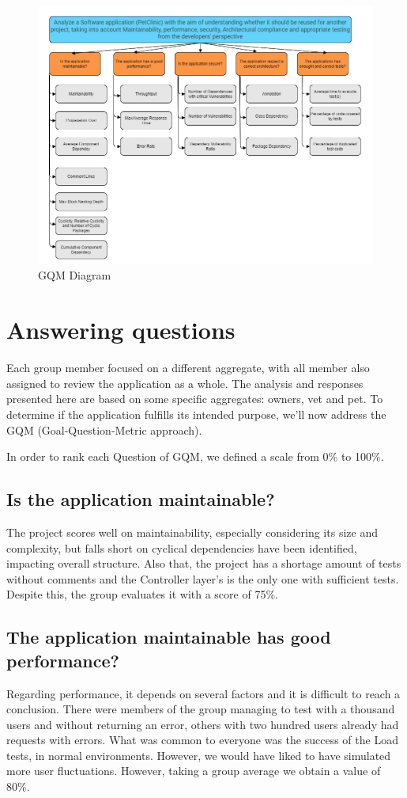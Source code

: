 \documentclass[a4paper,11pt,openright,BCOR=15mm]{scrbook}
\begin{document}
	\begin{figure}[H]
		\includegraphics[width=\textwidth]{figs/GQM.png}
		\caption{GQM Diagram}
		\label{fig:GQM}
		\centering
	\end{figure}
	
	
	\section{Answering questions}
	Each group member focused on a different aggregate, with all member also assigned to review the application as a whole. The analysis and responses presented here are based on some specific aggregates: owners, vet and pet. To determine if the application fulfills its intended purpose, we’ll now address the GQM (Goal-Question-Metric approach).
	
	In order to rank each Question of GQM, we defined a scale from 0\% to 100\%.
	
			\subsection{Is the application maintainable?}			
				The project scores well on maintainability, especially considering its size and complexity, but falls short on cyclical dependencies have been identified, impacting overall structure.			
				Also that, the project has a shortage amount of tests without comments and the Controller layer's is the only one with sufficient tests.		
				Despite this, the group evaluates it with a score of 75\%.
			
			\subsection{The application maintainable has good performance?}			
				Regarding performance, it depends on several factors and it is difficult to reach a conclusion. There were members of the group managing to test with a thousand users and without returning an error, others with two hundred users already had requests with errors.			
				What was common to everyone was the success of the Load tests, in normal environments. However, we would have liked to have simulated more user fluctuations.			
				However, taking a group average we obtain a value of 80\%.
			
\end{document}
